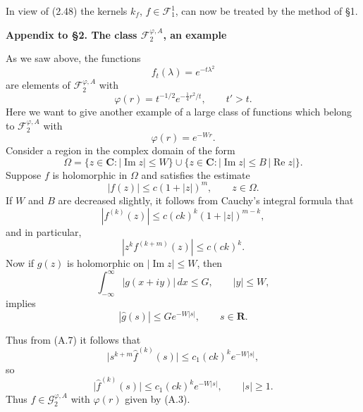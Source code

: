 In view of (2.48) the kernels $k_f$, $f\in \mathscr{F}_1^1$, can now be treated by the method of \S1.

\begin{center}
\textbf{Appendix to \S2. The class $\mathscr{F}_2^{\varphi,A}$, an example}
\end{center}

As we saw above, the functions
\begin{equation}\tag{A.1}
f_t(\lambda)=e^{-t\lambda^2}
\end{equation}
are elements of $\mathscr{F}_2^{\varphi,A}$ with
\begin{equation}\tag{A.2}
\varphi(r)=t^{-1/2}e^{-\frac14 r^2/t},\qquad t'>t.
\end{equation}
Here we want to give another example of a large class of functions which
belong to $\mathscr{F}_2^{\varphi,A}$ with
\begin{equation}\tag{A.3}
\varphi(r)=e^{-Wr}.
\end{equation}
Consider a region in the complex domain of the form
\begin{equation}\tag{A.4}
\Omega=\{z\in \mathbf{C}: |\operatorname{Im} z|\le W\}\cup\{z\in \mathbf{C}: |\operatorname{Im} z|\le B\,|\operatorname{Re} z|\}.
\end{equation}
Suppose $f$ is holomorphic in $\Omega$ and satisfies the estimate
\begin{equation}\tag{A.5}
|f(z)|\le c(1+|z|)^m,\qquad z\in \Omega.
\end{equation}
If $W$ and $B$ are decreased slightly, it follows from Cauchy's integral formula
that
\begin{equation}\tag{A.6}
|f^{(k)}(z)|\le c(ck)^k(1+|z|)^{m-k},
\end{equation}
and in particular,
\begin{equation}\tag{A.7}
|z^k f^{(k+m)}(z)|\le c(ck)^k.
\end{equation}
Now if $g(z)$ is holomorphic on $|\operatorname{Im} z|\le W$, then
\begin{equation}\tag{A.8}
\int_{-\infty}^{\infty}|g(x+iy)|\,dx\le G,\qquad |y|\le W,
\end{equation}
implies
\begin{equation}\tag{A.9}
|\hat g(s)|\le Ge^{-W|s|},\qquad s\in \mathbf{R}.
\end{equation}

Thus from (A.7) it follows that
\[
\tag{A.10}
\lvert s^{k+m}\hat{f}^{(k)}(s)\rvert \le c_1 (ck)^k e^{-W\lvert s\rvert},
\]
so
\[
\tag{A.11}
\lvert \hat{f}^{(k)}(s)\rvert \le c_1 (ck)^k e^{-W\lvert s\rvert}, \qquad \lvert s\rvert \ge 1.
\]
Thus $f \in \mathcal{G}^{\varphi,A}_{2}$ with $\varphi(r)$ given by (A.3).
